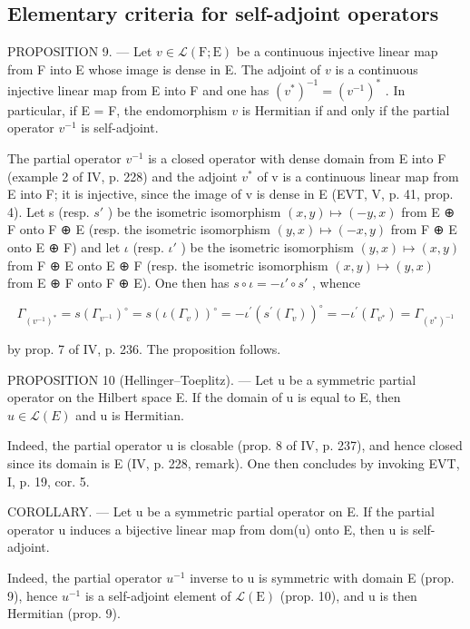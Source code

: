 \subsection{Elementary criteria for self-adjoint operators}

PROPOSITION 9. --- Let \(v \in \mathcal{L}(\mathrm{F};\mathrm{E})\) be a continuous injective linear map from F into E whose image is dense in E. The adjoint of \(v\) is a continuous injective linear map from E into F and one has \((v^{*})^{-1} = (v^{-1})^{*}\) . In particular, if E = F, the endomorphism \(v\) is Hermitian if and only if the partial operator \(v^{-1}\) is self-adjoint.

The partial operator \(v^{-1}\) is a closed operator with dense domain from E into F (example 2 of IV, p. 228) and the adjoint \(v^{*}\) of v is a continuous linear map from E into F; it is injective, since the image of v is dense in E (EVT, V, p. 41, prop. 4). Let s (resp. \(s'\) ) be the isometric isomorphism \((x,y)\mapsto(-y,x)\) from E ⊕ F onto F ⊕ E (resp. the isometric isomorphism \((y,x)\mapsto(-x,y)\) from F ⊕ E onto E ⊕ F) and let \(\iota\) (resp. \(\iota'\) ) be the isometric isomorphism \((y,x)\mapsto(x,y)\) from F ⊕ E onto E ⊕ F (resp. the isometric isomorphism \((x,y)\mapsto(y,x)\) from E ⊕ F onto F ⊕ E). One then has \(s\circ\iota=-\iota'\circ s'\) , whence

\[
\Gamma_ {(v ^ {- 1}) ^ {*}} = s \left(\Gamma_ {v ^ {- 1}}\right) ^ {\circ} = s \left(\iota \left(\Gamma_ {v}\right)\right) ^ {\circ} = - \iota^ {\prime} \left(s ^ {\prime} \left(\Gamma_ {v}\right)\right) ^ {\circ} = - \iota^ {\prime} \left(\Gamma_ {v ^ {*}}\right) = \Gamma_ {(v ^ {*}) ^ {- 1}}
\]

by prop. 7 of IV, p. 236. The proposition follows.

PROPOSITION 10 (Hellinger--Toeplitz). --- Let u be a symmetric partial operator on the Hilbert space E. If the domain of u is equal to E, then \(u \in \mathcal{L}(E)\) and u is Hermitian.

Indeed, the partial operator u is closable (prop. 8 of IV, p. 237), and hence closed since its domain is E (IV, p. 228, remark). One then concludes by invoking EVT, I, p. 19, cor. 5.

COROLLARY. --- Let u be a symmetric partial operator on E. If the partial operator u induces a bijective linear map from dom(u) onto E, then u is self-adjoint.

Indeed, the partial operator \(u^{-1}\) inverse to u is symmetric with domain E (prop. 9), hence \(u^{-1}\) is a self-adjoint element of \(\mathcal{L}(\mathrm{E})\) (prop. 10), and u is then Hermitian (prop. 9).

